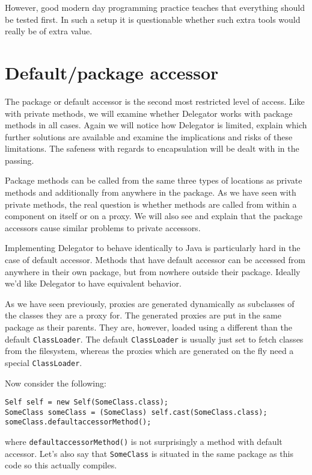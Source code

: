 \documentclass[a4paper,12pt]{book}
\begin{document}
However, good modern day programming practice teaches that everything should be tested first. In such a setup it is questionable whether such extra tools would really be of extra value.

\section*{Default/package accessor}
The package or default accessor is the second most restricted level of access. Like with private methods, we will examine whether Delegator works with package methods in all cases. Again we will notice how Delegator is limited, explain which further solutions are available and examine the implications and risks of these limitations. The safeness with regards to encapsulation will be dealt with in the passing.

Package methods can be called from the same three types of locations as private methods and additionally from anywhere in the package. As we have seen with private methods, the real question is whether methods are called from within a component on itself or on a proxy. We will also see and explain that the package accessors cause similar problems to private accessors.

Implementing Delegator to behave identically to Java is particularly hard in the case of default accessor. Methods that have default accessor can be accessed from anywhere in their own package, but from nowhere outside their package. Ideally we'd like Delegator to have equivalent behavior. 

As we have seen previously, proxies are generated dynamically as subclasses of the classes they are a proxy for. The generated proxies are put in the same package as their parents. They are, however, loaded using a different than the default \verb|ClassLoader|. The default \verb|ClassLoader| is usually just set to fetch classes from the filesystem, whereas the proxies which are generated on the fly need a special \verb|ClassLoader|.

Now consider the following:

\begin{verbatim}
Self self = new Self(SomeClass.class);
SomeClass someClass = (SomeClass) self.cast(SomeClass.class);
someClass.defaultaccessorMethod();
\end{verbatim}

where \verb|defaultaccessorMethod()| is not surprisingly a method with default accessor. Let's also say that \verb|SomeClass| is situated in the same package as this code so this actually compiles.
\end{document}
